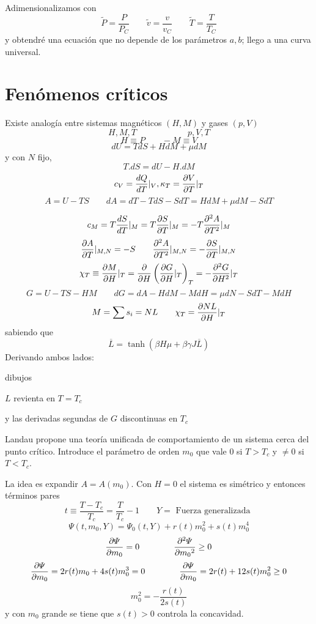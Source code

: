 \documentclass[10pt,oneside]{CBFT_book}
\begin{document}
Adimensionalizamos con 
\[
	\tilde{P} = \frac{P}{P_C} \qquad 
	\tilde{v} = \frac{v}{v_C} \qquad 
	\tilde{T} = \frac{T}{T_C}
\]
y obtendré una ecuación que no depende de los parámetros $a,b$; llego a una curva universal.

\section{Fenómenos críticos}

Existe analogía entre sistemas magnéticos $(H,M)$ y gases $(p,V)$
\[
	H,M,T	\qquad \qquad \qquad p,V,T
\]
\[
	H \equiv P \qquad -M \equiv V
\]
\[
	dU = TdS + HdM + \mu dM 
\]
y con $N$ fijo,
\[
	T.dS = dU - H.dM	
\]
\[
	c_V = \dtot{Q}{T}|_V, \kappa_T = \dpar{V}{T}|_T
\]
\[
	A = U - TS \qquad dA = dT - TdS - SdT = HdM + \mu dM - SdT
\]

\[
	c_M = T\dtot{S}{T}|_M = T \dpar{S}{T}|_M = -T\dpar[2]{A}{T}|_M 
\]
\[
	\dpar{A}{T}|_{M,N} = -S \qquad \dpar[2]{A}{T}|_{M,N} = -\dpar{S}{T}|_{M,N}
\]
\[
	\chi_T \equiv \dpar{M}{H}|_T = \dpar{}{H}\left(\dpar{G}{H}|_T\right)_T = - \dpar[2]{G}{H}|_T
\]
\[
	G = U - TS -HM \qquad dG = dA - HdM - MdH = \mu dN - SdT - M dH
\]
\[
	M = \sum s_i = NL \qquad \chi_T = \dpar{NL}{H}|_T
\]
sabiendo que 
\[
	\overline{L} = \tanh ( \beta H \mu + \beta \gamma J \overline{L} )
\]
Derivando ambos lados:

dibujos

$L$ revienta en $T=T_c$


y las derivadas segundas de $G$ discontinuas en $T_c$

Landau propone una teoría unificada de comportamiento de un sistema cerca del punto crítico.
Introduce el parámetro de orden $m_0$ que vale 0 si $T>T_c$ y $\neq 0$ si $T<T_c$.

La idea es expandir $ A = A(m_0) $.
Con $H=0$ el sistema es simétrico y entonces términos pares
\[
	t \equiv \frac{T-T_c}{T_c} = \frac{T}{T_c} -1  \qquad Y = \text{ Fuerza generalizada }
\]
\[
	\Psi( t, m_0,Y ) = \Psi_0( t, Y ) + r(t) m_0^2 + s(t) m_0^4
\]
\[	
	\dpar{\Psi}{m_0} = 0 \qquad  \qquad  \dpar[2]{\Psi}{m_0} \geq 0
\]
\[	
	\dpar{\Psi}{m_0} = 2 r(t) m_0 + 4 s(t) m_0^3 = 0 \qquad \qquad 
	\dpar{\Psi}{m_0} = 2 r(t) + 12 s(t) m_0^2 \geq 0
\]
\[	
	m_0^2 = -\frac{r(t)}{2s(t)}
\]
y con $m_0$ grande se tiene que $s(t)>0$ controla la concavidad.
\end{document}
